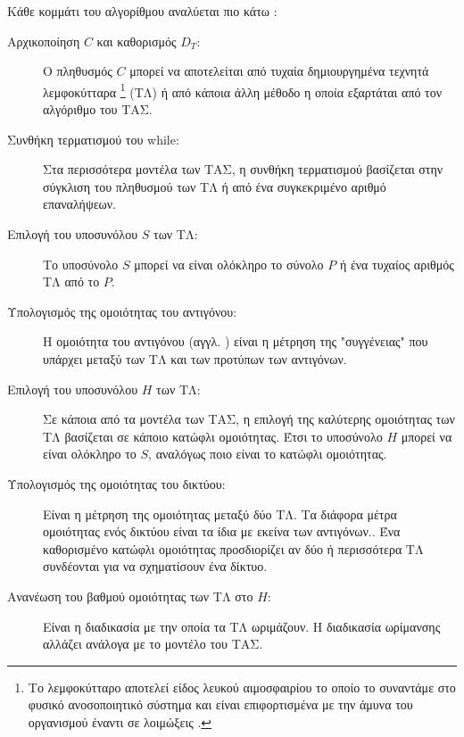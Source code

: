 \documentclass{assignment}
\begin{document}
Κάθε κομμάτι του αλγορίθμου αναλύεται πιο κάτω \cite{engelbrecht}:
\begin{description}
\item[Αρχικοποίηση $C$ και καθορισμός $D_T$:] Ο πληθυσμός $C$ μπορεί να αποτελείται από τυχαία δημιουργημένα τεχνητά λεμφοκύτταρα \footnote{Το λεμφοκύτταρο αποτελεί είδος λευκού αιμοσφαιρίου το οποίο το συναντάμε στο φυσικό ανοσοποιητικό σύστημα και είναι επιφορτισμένα με την άμυνα του οργανισμού έναντι σε λοιμώξεις \cite{wiki:lymphocytes}.} (ΤΛ) ή από κάποια άλλη μέθοδο η οποία εξαρτάται από τον αλγόριθμο του ΤΑΣ.

\item[Συνθήκη τερματισμού του while:] Στα περισσότερα μοντέλα των ΤΑΣ, η συνθήκη τερματισμού βασίζεται στην σύγκλιση του πληθυσμού των ΤΛ ή από ένα συγκεκριμένο αριθμό επαναλήψεων.

\item[Επιλογή του υποσυνόλου $S$ των ΤΛ:] Το υποσύνολο $S$ μπορεί να είναι ολόκληρο το σύνολο $P$ ή ένα τυχαίος αριθμός ΤΛ από το $P$. 

\item[Υπολογισμός της ομοιότητας του αντιγόνου:] Η ομοιότητα του αντιγόνου (αγγλ. ) είναι η μέτρηση της "συγγένειας" που υπάρχει μεταξύ των ΤΛ και των προτύπων των αντιγόνων. 

\item[Επιλογή του υποσυνόλου $H$ των ΤΛ:] Σε κάποια από τα μοντέλα των ΤΑΣ, η επιλογή της καλύτερης ομοιότητας των ΤΛ βασίζεται σε κάποιο κατώφλι ομοιότητας. Έτσι το υποσύνολο $H$ μπορεί να είναι ολόκληρο το $S$, αναλόγως ποιο είναι το κατώφλι ομοιότητας.

\item[Υπολογισμός της ομοιότητας του δικτύου:] Είναι η μέτρηση της ομοιότητας μεταξύ δύο ΤΛ. Τα διάφορα μέτρα ομοιότητας ενός δικτύου είναι τα ίδια με εκείνα των αντιγόνων.. Ένα καθορισμένο κατώφλι ομοιότητας προσδιορίζει αν δύο ή περισσότερα ΤΛ συνδέονται για να σχηματίσουν ένα δίκτυο.

\item[Ανανέωση του βαθμού ομοιότητας των ΤΛ στο $H$:] Είναι η διαδικασία με την οποία τα ΤΛ ωριμάζουν. Η διαδικασία ωρίμανσης αλλάζει ανάλογα με το μοντέλο του ΤΑΣ.

\end{description}
\end{document}
